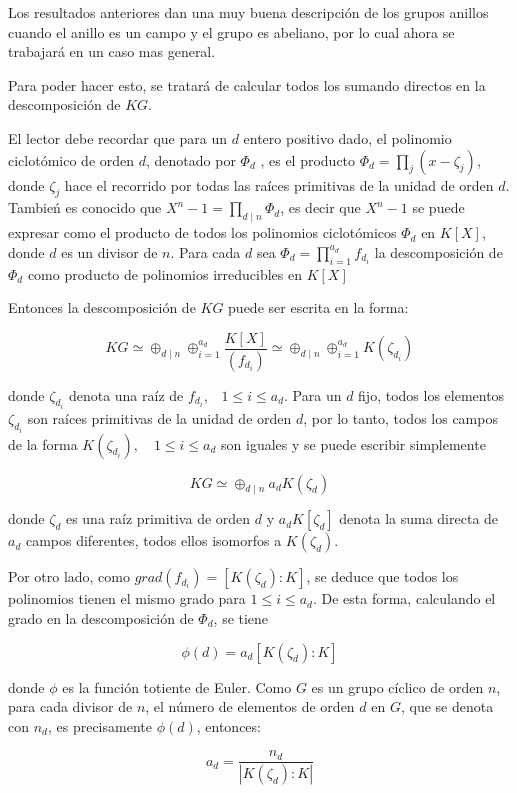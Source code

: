 Los resultados anteriores dan una muy buena descripción de los grupos anillos cuando el anillo es un campo y el grupo es abeliano, por lo cual ahora se trabajará en un caso mas general. 


Para poder hacer esto, se tratará de calcular todos los sumando directos en la descomposición de $KG$.  

El lector debe recordar que para un $d$ entero positivo dado, el polinomio ciclotómico de orden $d$, denotado por $\Phi_d$ , es el producto $\Phi_d = \prod_{j}(x-\zeta_j)$, donde $\zeta_j$ hace el recorrido por todas las raíces primitivas de la unidad de orden $d$. Tambień es conocido que $X^n -1 = \prod_{d\mid n} \Phi_d $, es decir que $X^n -1 $ se puede expresar como el producto de todos los polinomios ciclotómicos $\Phi_d$ en $K[X]$, donde $d$ es un divisor de $n$. Para cada $d$ sea $\Phi_d = \prod_{i=1}^{a_d}f_{d_i}$ la descomposición de $\Phi_d$ como producto de polinomios irreducibles en $K[X]$

Entonces la descomposición de $KG$ puede ser escrita en la forma:

\[ KG \simeq \oplus_{d \mid n} \oplus_{i=1}^{a_d} \frac{K[X]}{(f_{d_i})} \simeq \oplus_{d \mid n} \oplus_{i=1}^{a_d} K(\zeta _{d_i}) \]

donde $\zeta_{d_i}$ denota una raíz de $f_{d_i}  \mbox{,} \quad 1 \leq i \leq a_d $. Para un $d$ fijo, todos los elementos $\zeta_{d_i}$ son raíces primitivas de la unidad de orden $d$, por lo tanto, todos los campos de la forma $K(\zeta_{d_i}), \quad 1\leq i \leq a_d$ son iguales y se puede escribir simplemente 

\[ KG \simeq \oplus_{d \mid n} a_dK(\zeta_d)\]

donde $\zeta_d$ es una raíz primitiva de orden $d$ y $a_dK[\zeta_d]$ denota la suma directa de $a_d$ campos diferentes, todos ellos isomorfos a $K(\zeta_d)$.

Por otro lado, como $grad(f_{d_i}) = [K(\zeta_d):K]$, se deduce que todos los polinomios tienen el mismo grado para $1 \leq i \leq a_d$. De esta forma, calculando el grado en la descomposición de $\Phi_d$, se tiene

\[ \phi(d) = a_d[K(\zeta_d):K] \]

donde $\phi$ es la función totiente de Euler. Como $G$ es un grupo cíclico de orden $n$, para cada divisor de $n$, el número de elementos de orden $d$ en $G$, que se denota con $n_d$, es precisamente $\phi(d)$, entonces:

\[ a_d = \frac{n_d}{| K(\zeta_d) : K|}  \]

